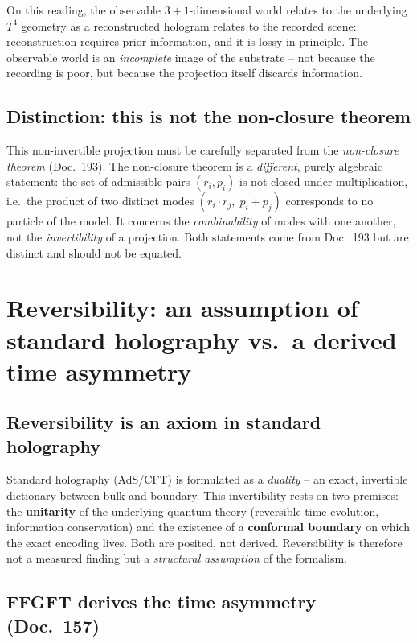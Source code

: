 \medskip

\noindent
On this reading, the observable $3{+}1$-dimensional world relates to the
underlying $T^4$ geometry as a reconstructed hologram relates to the recorded
scene: reconstruction requires prior information, and it is lossy in
principle. The observable world is an \emph{incomplete} image of the substrate
-- not because the recording is poor, but because the projection itself
discards information.

\subsection*{Distinction: this is not the non-closure theorem}

This non-invertible projection must be carefully separated from the
\emph{non-closure theorem} (Doc.~193). The non-closure theorem is a
\emph{different}, purely algebraic statement: the set of admissible pairs
$(r_i, p_i)$ is not closed under multiplication, i.e.\ the product of two
distinct modes $(r_i\cdot r_j,\; p_i+p_j)$ corresponds to no particle of the
model. It concerns the \emph{combinability} of modes with one another, not the
\emph{invertibility} of a projection. Both statements come from Doc.~193 but
are distinct and should not be equated.

\section{Reversibility: an assumption of standard holography vs.\ a derived time asymmetry}

\subsection*{Reversibility is an axiom in standard holography}

Standard holography (AdS/CFT) is formulated as a \emph{duality} -- an exact,
invertible dictionary between bulk and boundary. This invertibility rests on
two premises: the \textbf{unitarity} of the underlying quantum theory
(reversible time evolution, information conservation) and the existence of a
\textbf{conformal boundary} on which the exact encoding lives. Both are
posited, not derived. Reversibility is therefore not a measured finding but a
\emph{structural assumption} of the formalism.

\subsection*{FFGFT derives the time asymmetry (Doc.~157)}

